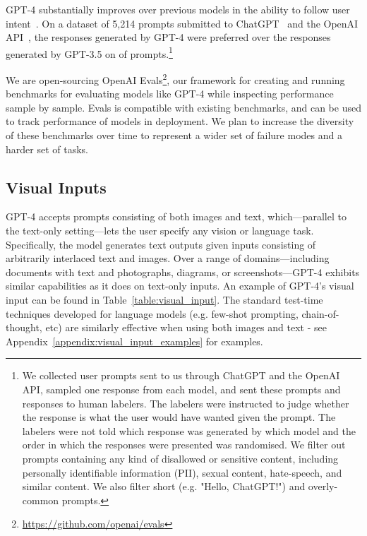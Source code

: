 \documentclass{article}
\begin{document}
GPT-4 substantially improves over previous models in the ability to follow user intent~\cite{ouyang2022training}. On a dataset of 5,214 prompts submitted to ChatGPT~\cite{openaichatgptblog} and the OpenAI API~\cite{openaiapiblog}, the responses generated by GPT-4 were preferred over the responses generated by GPT-3.5 on  of prompts.\footnote{We collected user prompts sent to us through ChatGPT and the OpenAI API, sampled one response from each model, and sent these prompts and responses to human labelers. The labelers were instructed to judge whether the response is what the user would have wanted given the prompt. The labelers were not told which response was generated by which model and the order in which the responses were presented was randomised. We filter out prompts containing any kind of disallowed or sensitive content, including personally identifiable information (PII), sexual content, hate-speech, and similar content. We also filter short (e.g. "Hello, ChatGPT!") and overly-common prompts.}


We are open-sourcing OpenAI Evals\footnote{\href{https://github.com/openai/evals}{https://github.com/openai/evals}}, our framework for creating and running benchmarks for evaluating models like GPT-4 while inspecting performance sample by sample. Evals is compatible with existing benchmarks, and can be used to track performance of models in deployment. We plan to increase the diversity of these benchmarks over time to represent a wider set of failure modes and a harder set of tasks.


\subsection{Visual Inputs}




GPT-4 accepts prompts consisting of both images and text, which—parallel to the text-only setting—lets the user specify any vision or language task.
Specifically, the model generates text outputs given inputs consisting of arbitrarily
interlaced text and images.
Over a range of domains—including documents with text and photographs, diagrams, or screenshots—GPT-4 exhibits similar capabilities as it does on text-only inputs. An example of GPT-4's visual input can be found in Table~\ref{table:visual_input}. The standard test-time techniques developed for language models (e.g. few-shot prompting, chain-of-thought, etc) are similarly effective when using both images and text - see Appendix~\ref{appendix:visual_input_examples} for examples.
\end{document}
